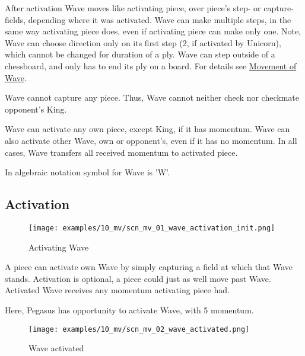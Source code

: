After activation Wave moves like activating piece, over piece's step- or capture-
fields, depending where it was activated. Wave can make multiple steps, in the
same way activating piece does, even if activating piece can make only one. Note,
Wave can choose direction only on its first step (2, if activated by Unicorn),
which cannot be changed for duration of a ply. Wave can step outside of a
chessboard, and only has to end its ply on a board. For details see
\hyperref[sec:Appendix/Movement of Wave]{Movement of Wave}.

Wave cannot capture any piece. Thus, Wave cannot neither check nor checkmate
opponent's King.

Wave can activate any own piece, except King, if it has momentum. Wave can
also activate other Wave, own or opponent's, even if it has no momentum. In
all cases, Wave transfers all received momentum to activated piece.

In algebraic notation symbol for Wave is 'W'.

\clearpage %

\subsection*{Activation}
\label{sec:Miranda's veil/Wave/Activation}

\vspace*{-1.4\baselineskip}
\noindent
\begin{figure}[!h]
\texttt{[image: examples/10\_mv/scn\_mv\_01\_wave\_activation\_init.png]}
\vspace*{-1.3\baselineskip}
\caption{Activating Wave}
\label{fig:scn_mv_01_wave_activation_init}
\end{figure}

\vspace*{-0.3\baselineskip}
A piece can activate own Wave by simply capturing a field at which that Wave stands.
Activation is optional, a piece could just as well move past Wave. Activated Wave
receives any momentum activating piece had.

Here, Pegasus has opportunity to activate Wave, with 5 momentum.

\clearpage %

\vspace*{-2.1\baselineskip}
\noindent
\begin{figure}[!h]
\texttt{[image: examples/10\_mv/scn\_mv\_02\_wave\_activated.png]}
\caption{Wave activated}
\label{fig:scn_mv_02_wave_activated}
\end{figure}

